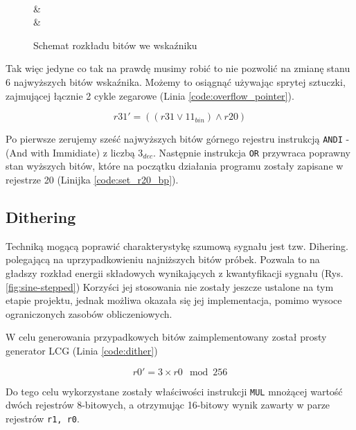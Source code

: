 \documentclass[12pt, a4paper]{article}
\begin{document}
\begin{figure}[h]
	\centering
	\hfill

	\begin{bytefield}[bitwidth=7mm,endianness=big]{16}
		 \\
		 & \\
		 & \\
	\end{bytefield}
	\caption{Schemat rozkładu bitów we wskaźniku}
	\label{fig:bits_ex}
\end{figure}

Tak więc jedyne co tak na prawdę musimy robić to nie pozwolić na zmianę stanu 6 najwyższych bitów wskaźnika.
Możemy to osiągnąć używając sprytej sztuczki, zajmującej łącznie 2 cykle zegarowe (Linia \ref{code:overflow_pointer}).

\begin{equation}
	r31' = \left( \left( r31 \lor 11_{bin} \right) \land r20 \right)
\end{equation}

Po pierwsze zerujemy sześć najwyższych bitów górnego rejestru instrukcją \verb|ANDI| - (And with Immidiate) z liczbą $3_{dec}$.
Następnie instrukcja \verb|OR| przywraca poprawny stan wyższych bitów, 
które na początku działania programu zostały zapisane w rejestrze 20 (Linijka \ref{code:set_r20_bp}).

\subsection{Dithering}
Techniką mogącą poprawić charakterystykę szumową sygnału jest tzw. Dihering. polegającą na uprzypadkowieniu najniższych bitów próbek.
Pozwala to na gładszy rozkład energii składowych wynikających z kwantyfikacji sygnału (Rys. \ref{fig:sine-stepped})
Korzyści jej stosowania nie zostały jeszcze ustalone na tym etapie projektu, jednak możliwa okazała się jej implementacja,
pomimo wysoce ograniczonych zasobów obliczeniowych.

W celu generowania przypadkowych bitów zaimplementowany został prosty generator LCG (Linia \ref{code:dither})

\begin{equation}
	r0'=3 \times r0 \mod 256
\end{equation}

Do tego celu wykorzystane zostały właściwości instrukcji \verb |MUL| mnożącej wartość dwóch rejestrów 8-bitowych,
a otrzymując 16-bitowy wynik zawarty w parze rejestrów \verb|r1, r0|.
\end{document}
